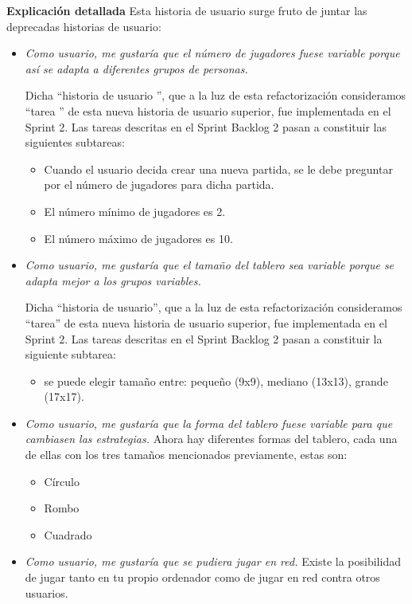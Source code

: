 \documentclass[../../FINAL/Scrum/SCRUM.tex]{subfiles}
\begin{document}
\textbf{Explicación detallada}
Esta historia de usuario surge fruto de juntar las deprecadas historias de usuario:
\begin{itemize}
\item  \textit{Como usuario, me gustaría que el número de jugadores fuese variable porque así se adapta a diferentes grupos de personas. }

    Dicha  ``historia de usuario '', que a la luz de esta refactorización consideramos  ``tarea '' de esta nueva historia de usuario superior, fue implementada en el Sprint 2. Las tareas descritas en el Sprint Backlog 2 pasan a constituir las siguientes subtareas:
    \begin{itemize}
  	  \item Cuando el usuario decida crear una nueva partida, se le debe preguntar por el número de jugadores para dicha partida.
      \item El número mínimo de jugadores es 2.
      \item El número máximo de jugadores es 10.
    \end{itemize}
    

\item  \textit{Como usuario, me gustaría que el tamaño del tablero sea variable porque se adapta mejor a los grupos variables. }

    Dicha  ``historia de usuario'', que a la luz de esta refactorización consideramos  ``tarea'' de esta nueva historia de usuario superior, fue implementada en el Sprint 2. Las tareas descritas en el Sprint Backlog 2 pasan a constituir la siguiente subtarea:
    \begin{itemize}
     \item se puede elegir tamaño entre: pequeño (9x9), mediano (13x13), grande (17x17).
	\end{itemize}

\item  \textit{Como usuario, me gustaría que la forma del tablero fuese variable para que cambiasen las estrategias. }
    Ahora hay diferentes formas del tablero, cada una de ellas con los tres tamaños mencionados previamente, estas son:
    \begin{itemize}
    	\item Círculo
    	\item Rombo
    	\item Cuadrado
    \end{itemize}

\item  \textit{Como usuario, me gustaría que se pudiera jugar en red. }
    Existe la posibilidad de jugar tanto en tu propio ordenador como de jugar en red contra otros usuarios.


\end{itemize}
\end{document}
